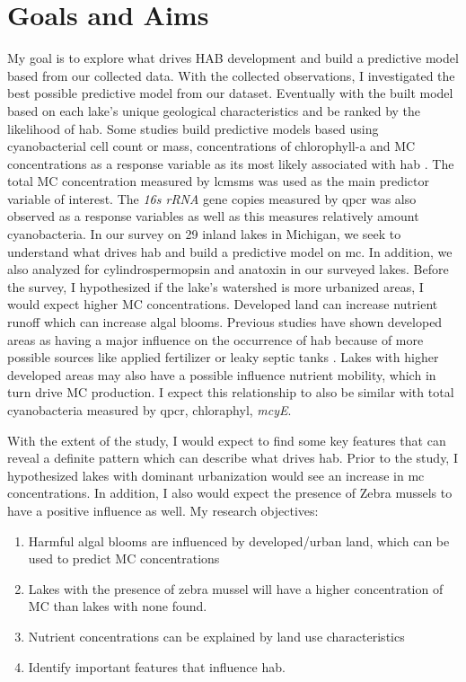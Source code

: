  \section{Goals and Aims}
My goal is to explore what drives HAB development and build a predictive model based from our collected data.  With the collected observations, I investigated the best possible predictive model from our dataset. Eventually with the built model based on each lake's unique geological characteristics and be ranked by the likelihood of \gls{hab}.
Some studies build predictive models based using cyanobacterial cell count or mass, concentrations of chlorophyll-a and MC concentrations as a response variable as its most likely associated with \gls{hab} \cite{moore_richard_cyanobacterial_1993, ahn_evaluation_2011, jiang_statistical_2008, beaulieu_nutrients_2013, taranu_predicting_2017}.
The total MC concentration measured by \gls{lcmsms} was used as the main predictor variable of interest. The \emph{16s rRNA} gene copies measured by \gls{qpcr} was also observed as a response variables as well as this measures relatively amount cyanobacteria. In our survey on 29 inland lakes in Michigan, we seek to understand what drives \gls{hab} and build a predictive model on \gls{mc}. In addition, we also analyzed for cylindrospermopsin and anatoxin in our surveyed lakes. Before the survey, I hypothesized if the lake's watershed is more urbanized areas, I would expect higher MC concentrations. Developed land can increase nutrient runoff which can increase algal blooms. Previous studies have shown developed areas as having a major influence on the occurrence of \gls{hab} because of more possible sources like applied fertilizer or leaky septic tanks \cite{beaver_land_2014, anderson_harmful_2002}. Lakes with higher developed areas may also have a possible influence nutrient mobility, which in turn drive MC production. I expect this relationship to also be similar with total cyanobacteria measured by \gls{qpcr}, chloraphyl, \emph{mcyE}. %

With the extent of the study, I would expect to find some key features that can reveal a definite pattern which can describe what drives \gls{hab}. Prior to the study, I hypothesized lakes with dominant urbanization would see an increase in \gls{mc} concentrations. In addition, I also would expect the presence of Zebra mussels to have a positive influence as well. My research objectives:

\begin{enumerate}
 \item Harmful algal blooms are influenced by  developed/urban land, which can be used to predict MC concentrations
 \item Lakes with the presence of zebra mussel will have a higher concentration of MC than lakes with none found.
 \item Nutrient concentrations can be explained by land use characteristics
 \item Identify important features that influence \gls{hab}.

\end{enumerate}
